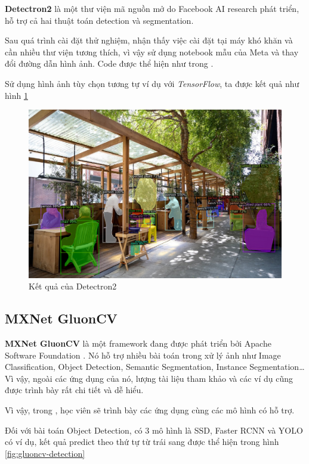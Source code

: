 \textbf{Detectron2}\cite{wu2019detectron2} là một thư viện mã nguồn mở do Facebook AI research phát triển, hỗ trợ cả hai thuật toán detection và segmentation.

Sau quá trình cài đặt thử nghiệm, nhận thấy việc cài đặt tại máy khó khăn và cần nhiều thư viện tương thích, vì vậy sử dụng notebook mẫu của Meta và thay đổi đường dẫn hình ảnh. Code được thể hiện như trong \cite{detectron2demo}.

Sử dụng hình ảnh tùy chọn tương tự ví dụ với \textit{TensorFlow}, ta được kết quả như hình \ref{fig:detection2}

\begin{figure}
    \centering
    \includegraphics[scale=0.2]{../code/processed/detection2.png}
    \caption{Kết quả của Detectron2}
    \label{fig:detection2}
\end{figure}

\subsection{MXNet GluonCV}

\textbf{MXNet GluonCV} là một framework đang được phát triển bởi Apache Software Foundation \cite{apacheglucon,gluoncvnlp2020}. Nó hỗ trợ nhiều bài toán trong xử lý ảnh như Image Classification, Object Detection, Semantic Segmentation, Instance Segmentation\dots Vì vậy, ngoài các ứng dụng của nó, lượng tài liệu tham khảo và các ví dụ cũng được trình bày rất chi tiết và dễ hiểu.

Vì vậy, trong \cite{gluonCVcode}, học viên sẽ trình bày các ứng dụng cùng các mô hình có hỗ trợ.

Đối với bài toán Object Detection, có 3 mô hình là SSD, Faster RCNN và YOLO có ví dụ, kết quả predict theo thứ tự từ trái sang được thể hiện trong hình \ref{fig:gluoncv-detection}

